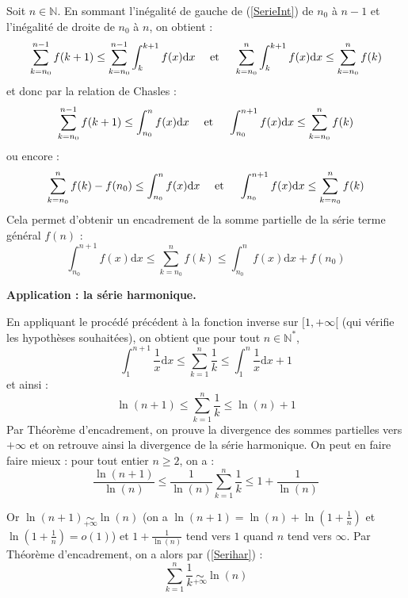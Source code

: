 \documentclass[french,11pt,twoside]{VcCours}
\newcommand{\dx}{\text{d}x}
\begin{document}
Soit $n \in \mathbb{N}$. En sommant l'inégalité de gauche de (\ref{SerieInt}) de $n_0$ à $n-1$ et l'inégalité de droite de $n_0$ à $n$, on obtient :
$$ \sum_{k=n_0}^{n-1} f(k+1) \leq  \sum_{k=n_0}^{n-1} \int_{k}^{k+1} f(x) \dx \quad \hbox{ et } \quad \sum_{k=n_0}^{n} \int_{k}^{k+1} f(x) \dx \leq \sum_{k=n_0}^n f(k) $$
et donc par la relation de Chasles :
$$ \sum_{k=n_0}^{n-1} f(k+1) \leq  \int_{n_0}^{n} f(x) \dx \quad \hbox{ et } \quad \int_{n_0}^{n+1} f(x) \dx \leq \sum_{k=n_0}^n f(k)$$
ou encore :
$$ \sum_{k=n_0}^n f(k) - f(n_0)  \leq  \int_{n_0}^{n} f(x) \dx \quad \hbox{ et } \quad \int_{n_0}^{n+1} f(x) \dx \leq \sum_{k=n_0}^n f(k)$$
Cela permet d'obtenir un encadrement de la somme partielle de la série terme général $f(n)$ :
$$\int_{n_0}^{n+1} f(x) \dx \leq \sum_{k=n_0}^n f(k) \leq \int_{n_0}^{n} f(x) \dx +f(n_0)$$

\vspace{0.3cm}


\textbf{Application : la série harmonique.} 

En appliquant le procédé précédent à la fonction inverse sur $[1, + \infty[$ (qui vérifie les hypothèses souhaitées), on obtient que pour tout $n \in \mathbb{N}^*$,
$$\int_{1}^{n+1} \frac{1}{x} \dx \leq \sum_{k=1}^n \frac{1}{k} \leq \int_{1}^{n} \frac{1}{x} \dx +1$$
et ainsi :
$$ \ln(n+1) \leq \sum_{k=1}^n \frac{1}{k} \leq \ln(n) +1$$
Par Théorème d'encadrement, on prouve la divergence des sommes partielles vers $+ \infty$ et on retrouve ainsi la divergence de la série harmonique. On peut en faire faire mieux : pour tout entier $n \geq 2$, on a :
\begin{equation}\label{Serihar}
\frac{\ln(n+1)}{\ln(n)} \leq \frac{1}{\ln(n)} \sum_{k=1}^n \frac{1}{k} \leq 1 + \frac{1}{\ln(n)}
\end{equation}

Or $\ln(n+1) \underset{+ \infty}{\sim} \ln(n)$ (on a $\ln(n+1) = \ln(n) + \ln \left(1+ \frac{1}{n}\right)$ et $\ln \left(1+ \frac{1}{n}\right) = o(1)$) et $1 + \frac{1}{\ln(n)}$ tend vers $1$ quand $n$ tend vers $\infty$. Par Théorème d'encadrement, on a alors par (\ref{Serihar}) :
$$ \sum_{k=1}^n \frac{1}{k} \underset{+ \infty}{\sim} \ln(n)$$
\end{document}
